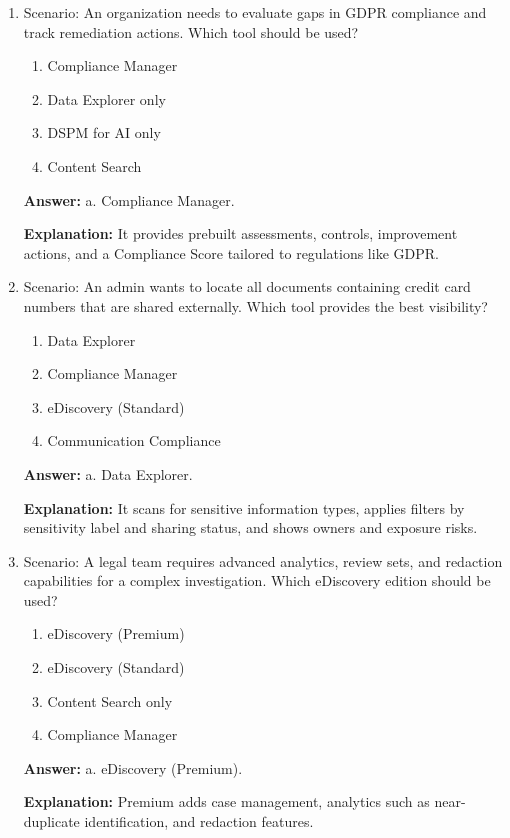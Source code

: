\documentclass[10pt]{article}
\begin{document}
\begin{enumerate}[leftmargin=*]
\textbf{Answer:} Compliance Manager \textrightarrow{} Risk assessment, Compliance Score, and improvement actions; Data Explorer \textrightarrow{} Discover and visualize sensitive data locations; DSPM for AI \textrightarrow{} Monitor AI interactions and shadow AI usage; eDiscovery (Premium) \textrightarrow{} Advanced case management, analytics, and redaction.

\textbf{Explanation:} Each tool addresses specific aspects of compliance, data discovery, AI governance, and legal investigations.

\item Scenario: An organization needs to evaluate gaps in GDPR compliance and track remediation actions. Which tool should be used?
\begin{enumerate}[label=\alph*., leftmargin=1.5em]
\item Compliance Manager
\item Data Explorer only
\item DSPM for AI only
\item Content Search
\end{enumerate}
\textbf{Answer:} a. Compliance Manager.

\textbf{Explanation:} It provides prebuilt assessments, controls, improvement actions, and a Compliance Score tailored to regulations like GDPR.

\item Scenario: An admin wants to locate all documents containing credit card numbers that are shared externally. Which tool provides the best visibility?
\begin{enumerate}[label=\alph*., leftmargin=1.5em]
\item Data Explorer
\item Compliance Manager
\item eDiscovery (Standard)
\item Communication Compliance
\end{enumerate}
\textbf{Answer:} a. Data Explorer.

\textbf{Explanation:} It scans for sensitive information types, applies filters by sensitivity label and sharing status, and shows owners and exposure risks.

\item Scenario: A legal team requires advanced analytics, review sets, and redaction capabilities for a complex investigation. Which eDiscovery edition should be used?
\begin{enumerate}[label=\alph*., leftmargin=1.5em]
\item eDiscovery (Premium)
\item eDiscovery (Standard)
\item Content Search only
\item Compliance Manager
\end{enumerate}
\textbf{Answer:} a. eDiscovery (Premium).

\textbf{Explanation:} Premium adds case management, analytics such as near-duplicate identification, and redaction features.
\end{enumerate}
\clearpage
\end{document}
